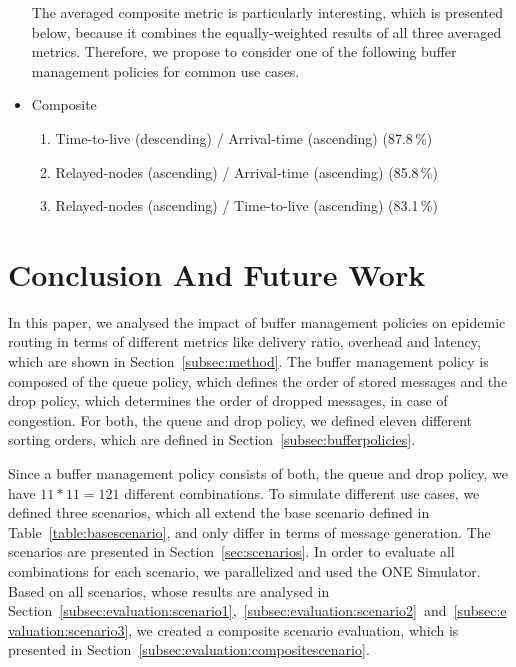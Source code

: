 \documentclass[conference,10pt,letterpaper,final]{IEEEtran}
\begin{document}
\begin{itemize}[leftmargin=*]
The averaged composite metric is particularly interesting, which is presented below, because it combines the equally-weighted results of all three averaged metrics.
Therefore, we propose to consider one of the following buffer management policies for common use cases.

\vspace{0.2cm}
 \item Composite
 \vspace{0.1cm}
 \begin{enumerate}
  \item Time-to-live (descending) / Arrival-time (ascending) (87.8\,\%)
  \vspace{0.2cm}
  \item Relayed-nodes (ascending) / Arrival-time (ascending) (85.8\,\%)
  \vspace{0.2cm}
  \item Relayed-nodes (ascending) / Time-to-live (ascending) (83.1\,\%)
  \vspace{0.2cm}
 \end{enumerate}
\end{itemize}




\section{Conclusion And Future Work}
\label{conclusion}
In this paper, we analysed the impact of buffer management policies on epidemic routing in terms of different metrics like delivery ratio, overhead and latency, which are shown in Section~\ref{subsec:method}.
The buffer management policy is composed of the queue policy, which defines the order of stored messages and the drop policy, which determines the order of dropped messages, in case of congestion.
For both, the queue and drop policy, we defined eleven different sorting orders, which are defined in Section~\ref{subsec:bufferpolicies}.

Since a buffer management policy consists of both, the queue and drop policy, we have $11 * 11 = 121$ different combinations.
To simulate different use cases, we defined three scenarios, which all extend the base scenario defined in Table~\ref{table:basescenario}, and only differ in terms of message generation.
The scenarios are presented in Section~\ref{sec:scenarios}.
In order to evaluate all combinations for each scenario, we parallelized and used the ONE Simulator.
Based on all scenarios, whose results are analysed in Section~\ref{subsec:evaluation:scenario1},~\ref{subsec:evaluation:scenario2}~and~\ref{subsec:evaluation:scenario3}, we created a composite scenario evaluation, which is presented in Section~\ref{subsec:evaluation:compositescenario}.
\end{document}
